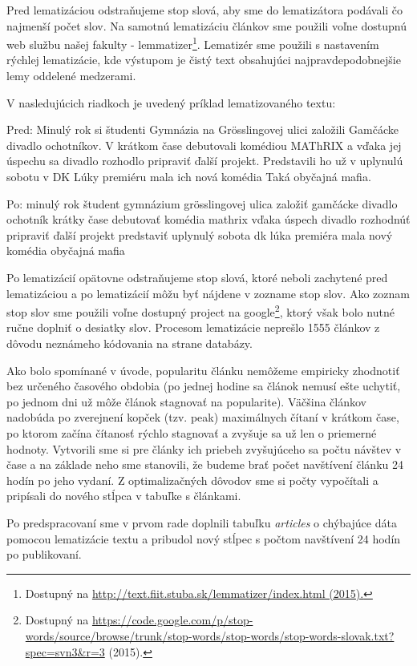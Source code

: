 \documentclass[runningheads,a4paper]{llncs}
\begin{document}
Pred lematizáciou odstraňujeme stop slová, aby sme do lematizátora podávali čo najmenší počet slov.
Na samotnú lematizáciu článkov sme použili voľne dostupnú web službu našej fakulty - lemmatizer\footnote{Dostupný na \url{http://text.fiit.stuba.sk/lemmatizer/index.html (2015).}}.
Lematizér sme použili s nastavením rýchlej lematizácie, kde výstupom je čistý text obsahujúci najpravdepodobnejšie lemy oddelené medzerami.

V nasledujúcich riadkoch je uvedený príklad lematizovaného textu:

\begin{multicols}{2}
Pred: Minulý rok si študenti Gymnázia na Grösslingovej ulici založili Gamčácke divadlo ochotníkov. V krátkom čase debutovali komédiou MAThRIX a vďaka jej úspechu sa divadlo rozhodlo pripraviť ďalší projekt. Predstavili ho už v uplynulú sobotu v DK Lúky premiéru mala ich nová komédia Taká obyčajná mafia.

Po: minulý rok študent gymnázium grösslingovej ulica založiť gamčácke divadlo ochotník krátky čase debutovať komédia mathrix vďaka úspech divadlo rozhodnúť pripraviť ďalší projekt predstaviť uplynulý sobota dk lúka premiéra mala nový komédia obyčajná mafia
\end{multicols}

Po lematizácií opätovne odstraňujeme stop slová, ktoré neboli zachytené pred lematizáciou a po lematizácií môžu byť nájdene v zozname stop slov.
Ako zoznam stop slov sme použili voľne dostupný project na google\footnote{Dostupný na \url{https://code.google.com/p/stop-words/source/browse/trunk/stop-words/stop-words/stop-words-slovak.txt?spec=svn3&r=3} (2015).}, ktorý však bolo nutné ručne doplniť o desiatky slov.
Procesom lematizácie neprešlo 1555 článkov z dôvodu neznámeho kódovania na strane databázy.

Ako bolo spomínané v úvode, popularitu článku nemôžeme empiricky zhodnotiť bez určeného časového obdobia (po jednej hodine sa článok nemusí ešte uchytiť, po jednom dni už môže článok stagnovať na popularite).
Väčšina článkov nadobúda po zverejnení kopček (tzv. peak) maximálnych čítaní v krátkom čase, po ktorom začína čítanosť rýchlo stagnovať a zvyšuje sa už len o priemerné hodnoty.
Vytvorili sme si pre články ich priebeh zvyšujúceho sa počtu návštev v čase a na základe neho sme stanovili, že budeme brať počet navštívení článku 24 hodín po jeho vydaní.
Z optimalizačných dôvodov sme si počty vypočítali a pripísali do nového stĺpca v tabuľke s článkami.

Po predspracovaní sme v prvom rade doplnili tabuľku {\em articles} o chýbajúce dáta pomocou lematizácie textu a pribudol nový stĺpec s počtom navštívení 24 hodín po publikovaní.
\end{document}
